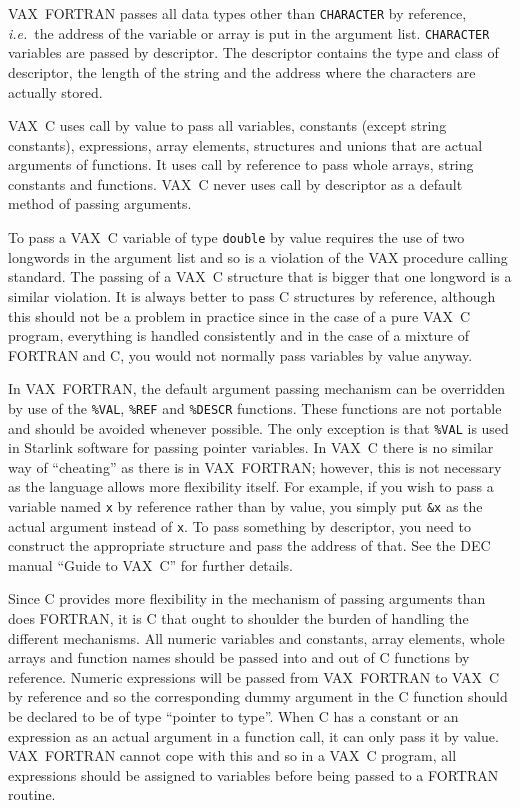 \documentclass[twoside,11pt]{article}
\renewcommand{\_}{\texttt{\symbol{95}}}
\begin{document}
VAX~FORTRAN passes all data types other than \texttt{CHARACTER} by reference, 
\textit{i.e.}\ the address of the variable or array is put in the argument list.
\texttt{CHARACTER} variables are passed by descriptor. 
The descriptor contains the type and class of descriptor, the length of the 
string and the address where the characters are actually stored.

VAX~C uses call by value to pass all variables, constants (except string
constants), expressions, array elements, structures and unions that are actual
arguments of functions. It uses call by reference to pass whole arrays, string
constants and functions. VAX~C never uses call by descriptor as a default
method of passing arguments.

To pass a VAX~C variable of type \texttt{double} by value requires the use of two
longwords in the argument list and so is a violation of the VAX procedure
calling standard. The passing of a VAX~C structure that is bigger that one
longword is a similar violation. It is always better to pass C structures by
reference, although this should not be a problem in practice since in the case
of a pure VAX~C program, everything is handled consistently and in the case of
a mixture of FORTRAN and C, you would not normally pass variables by value
anyway.

In VAX~FORTRAN, the default argument passing mechanism can be overridden by use
of the \texttt{\%VAL}, \texttt{\%REF} and \texttt{\%DESCR} functions. 
These functions are not portable and should be avoided whenever possible. 
The only exception is that \texttt{\%VAL} is used in Starlink software for 
passing pointer variables. 
In VAX~C there is no similar way of ``cheating'' as there is in VAX~FORTRAN;
however, this is not necessary as the language allows more flexibility itself.
For example, if you wish to pass a variable named \texttt{x} by reference rather
than by value, you simply put \texttt{\&x} as the actual argument instead of 
\texttt{x}. 
To pass something by descriptor, you need to construct the appropriate
structure and pass the address of that. See the DEC manual ``Guide to VAX~C''
for further details.

Since C provides more flexibility in the mechanism of passing arguments than
does FORTRAN, it is C that ought to shoulder the burden of handling the
different mechanisms. All numeric variables and constants, array elements,
whole arrays and function names should be passed into and out of C functions by
reference. Numeric expressions will be passed from VAX~FORTRAN to VAX~C by
reference and so the corresponding dummy argument in the C function should be
declared to be of type ``pointer to type''. When C has a constant or an
expression as an actual argument in a function call, it can only pass it by
value. VAX~FORTRAN cannot cope with this and so in a VAX~C program, all
expressions should be assigned to variables before being passed to a FORTRAN
routine.
\end{document}
